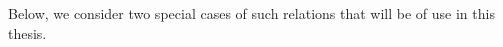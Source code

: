     Below, we consider two special cases of such relations that will be of use in this thesis.

    











        





